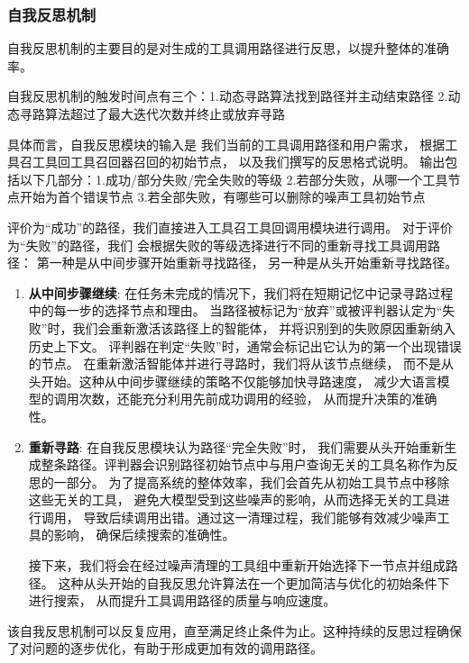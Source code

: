 \subsubsection{自我反思机制}

自我反思机制的主要目的是对生成的工具调用路径进行反思，以提升整体的准确率。

自我反思机制的触发时间点有三个：1.动态寻路算法找到路径并主动结束路径 2.动态寻路算法超过了最大迭代次数并终止或放弃寻路

具体而言，自我反思模块的输入是
我们当前的工具调用路径和用户需求，
根据工具召工具回工具召回器召回的初始节点，
以及我们撰写的反思格式说明。
输出包括以下几部分：1.成功/部分失败/完全失败的等级 2.若部分失败，从哪一个工具节点开始为首个错误节点 3.若全部失败，有哪些可以删除的噪声工具初始节点

评价为“成功”的路径，我们直接进入工具召工具回调用模块进行调用。
对于评价为“失败”的路径，我们
会根据失败的等级选择进行不同的重新寻找工具调用路径：
第一种是从中间步骤开始重新寻找路径，
另一种是从头开始重新寻找路径。

\begin{enumerate}
  \item \textbf{从中间步骤继续}: 在任务未完成的情况下，我们将在短期记忆中记录寻路过程中的每一步的选择节点和理由。
  当路径被标记为“放弃”或被评判器认定为“失败”时，我们会重新激活该路径上的智能体，
  并将识别到的失败原因重新纳入历史上下文。
  评判器在判定“失败”时，通常会标记出它认为的第一个出现错误的节点。
  在重新激活智能体并进行寻路时，我们将从该节点继续，
  而不是从头开始。这种从中间步骤继续的策略不仅能够加快寻路速度，
  减少大语言模型的调用次数，还能充分利用先前成功调用的经验，
  从而提升决策的准确性。
  \item \textbf{重新寻路}: 在自我反思模块认为路径“完全失败”时，
  我们需要从头开始重新生成整条路径。评判器会识别路径初始节点中与用户查询无关的工具名称作为反思的一部分。
  为了提高系统的整体效率，我们会首先从初始工具节点中移除这些无关的工具，
  避免大模型受到这些噪声的影响，从而选择无关的工具进行调用，
  导致后续调用出错。通过这一清理过程，我们能够有效减少噪声工具的影响，
  确保后续搜索的准确性。\par
  接下来，我们将会在经过噪声清理的工具组中重新开始选择下一节点并组成路径。
  这种从头开始的自我反思允许算法在一个更加简洁与优化的初始条件下进行搜索，
  从而提升工具调用路径的质量与响应速度。
\end{enumerate}
 
该自我反思机制可以反复应用，直至满足终止条件为止。这种持续的反思过程确保了对问题的逐步优化，有助于形成更加有效的调用路径。

